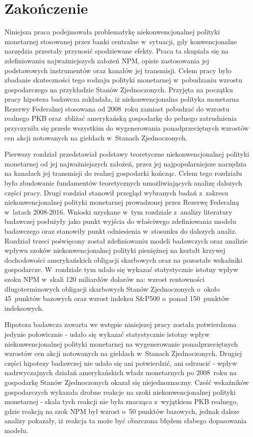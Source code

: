 \newpage
\chapter*{Zakończenie}
 
Niniejsza praca podejmowała problematykę niekonwencjonalnej polityki monetarnej stosowanej przez banki centralne w~sytuacji, gdy konwencjonalne narzędzia przestały przynosić spodziewane efekty. Praca ta skupiała się na zdefiniowaniu najważniejszych założeń \acs{NPM}, opisie zastosowania jej podstawowych instrumentów oraz kanałów jej transmisji. Celem pracy było zbadanie skuteczności tego rodzaju polityki monetarnej w~pobudzaniu wzrostu gospodarczego na przykładzie Stanów Zjednoczonych. Przyjęta na początku pracy hipoteza badawcza zakładała, iż niekonwencjonalna polityka monetarna Rezerwy Federalnej stosowana od 2008~roku zamiast pobudzać do wzrostu realnego \acs{PKB} oraz~zbliżać amerykańską gospodarkę do pełnego zatrudnienia przyczyniła się przede wszystkim do wygenerowania ponadprzeciętnych wzrostów cen akcji notowanych na giełdach w~Stanach Zjednoczonych.

Pierwszy rozdział przedstawiał podstawy teoretyczne niekonwencjonalnej polityki monetarnej od jej najważniejszych założeń, przez jej najpopularniejsze narzędzia na kanałach jej transmisji do realnej gospodarki kończąc. Celem tego rozdziału było zbudowanie fundamentów teoretycznych umożliwiających analizę dalszych części pracy. Drugi rozdział stanowił przegląd wybranych badań z~zakresu niekonwencjonalnej polityki monetarnej prowadzonej przez Rezerwę Federalną w~latach 2008-2016. Wnioski uzyskane w~tym rozdziale z~analizy literatury badawczej posłużyły jako punkt wyjścia do właściwego zdefiniowania modelu badawczego oraz stanowiły punkt odniesienia w~stosunku do dalszych analiz. Rozdział trzeci poświęcony został zdefiniowaniu modeli badawczych oraz analizie wpływu szoków niekonwencjonalnej polityki pieniężnej na kształt krzywej dochodowości amerykańskich obligacji skarbowych oraz na pozostałe wskaźniki gospodarcze. W~rozdziale tym udało się wykazać statystycznie istotny wpływ szoku \acs{NPM} w~skali 120 miliardów dolarów na: wzrost rentowności długoterminowych obligacji skarbowych Stanów Zjednoczonych o~około 45~punktów bazowych oraz wzrost indeksu S\&P500 o~ponad 150~punktów indeksowych.

Hipoteza badawcza zawarta we wstępie niniejszej pracy została potwierdzona jedynie połowicznie - udało się wykazać statystycznie istotny wpływ niekonwencjonalnej polityki monetarnej na wygenerowanie ponadprzeciętnych wzrostów cen akcji notowanych na giełdach w~Stanach Zjednoczonych. Drugiej części hipotezy badawczej nie udało się ani potwierdzić, ani odrzucić - wpływ nadzwyczajnych działań amerykańskich władz monetarnych po 2008~roku na gospodarkę Stanów Zjednoczonych okazał się niejednoznaczny. Cześć wskaźników gospodarczych wykazała drobne reakcje na szoki niekonwencjonalnej polityki monetarnej - skala tych reakcji nie była znacząca z~wyjątkiem PKB realnego, gdzie reakcją na szok \acs{NPM} był wzrost o~50 punktów bazowych, jednak dalsze analizy pokazały, iż reakcja ta może być obarczona błędem słabego dopasowania modelu.

